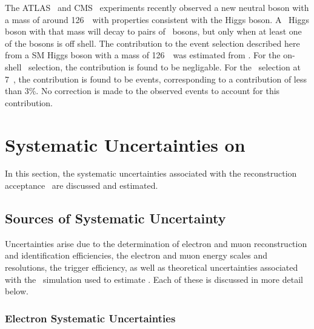 The ATLAS~\cite{ATLAS_Higgs:2012gk} and CMS~\cite{CMS_Higgs:2012gu} experiments
recently observed a new neutral boson with a mass of around 126~\gev\ with
properties consistent with the Higgs boson. A \sm\ Higgs boson with that mass will
decay to pairs of \Z\ bosons, but only when at least one of the bosons is off
shell. The contribution to the event selection described here from a SM Higgs
boson with a mass of 126~\gev\ was estimated from \mc. For the on-shell \ZZ\
selection, the contribution is found to be negligable. For the \ZZs\ selection
at 7~\tev, the contribution is found to be \measStat{1.7}{\errSym{0.03}} events,
corresponding to a contribution of less than 3\%. No correction is made to the
observed events to account for this contribution.

\section{Systematic Uncertainties on \CZZ}

In this section, the systematic uncertainties associated with the reconstruction
acceptance \CZZ\ are discussed and estimated. %

\subsection{Sources of Systematic Uncertainty}

Uncertainties arise due to the determination of
electron and muon reconstruction and identification efficiencies, the electron
and muon energy scales and resolutions, the trigger efficiency, as well as
theoretical uncertainties associated with the \mc\ simulation used to estimate
\CZZ. Each of these is discussed in more detail below.

\subsubsection{Electron Systematic Uncertainties}

